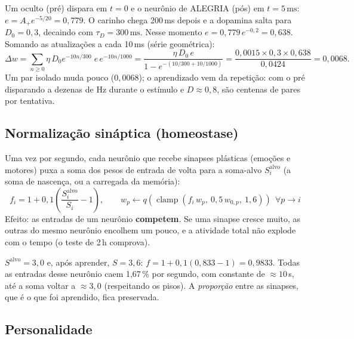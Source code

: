 \documentclass[11pt,a4paper]{article}
\newcommand{\ms}{\,\mathrm{ms}}
\begin{document}
\begin{exemplo}
Um oculto (pré) dispara em $t=0$ e o neurônio de ALEGRIA (pós) em $t=5\ms$: $e = A_+ e^{-5/20} = 0{,}779$.
O carinho chega 200\,ms depois e a dopamina salta para $D_0 = 0{,}3$, decaindo com $\tau_D = 300\ms$.
Nesse momento $e = 0{,}779\,e^{-0{,}2} = 0{,}638$. Somando as atualizações a cada 10\,ms (série geométrica):
\[
\Delta w = \sum_{n\ge0} \eta\, D_0 e^{-10n/300}\; e\, e^{-10n/1000} = \frac{\eta\,D_0\,e}{1 - e^{-(10/300 + 10/1000)}}
= \frac{0{,}0015 \times 0{,}3 \times 0{,}638}{0{,}0424} = 0{,}0068 .
\]
Um par isolado muda pouco ($0{,}0068$); o aprendizado vem da repetição: com o pré disparando a dezenas de Hz durante o estímulo e
$D \approx 0{,}8$, são centenas de pares por tentativa.
\end{exemplo}

\subsection{Normalização sináptica (homeostase)}

Uma vez por segundo, cada neurônio que recebe sinapses plásticas (emoções e motores) puxa a soma dos pesos de entrada de volta para
a soma-alvo $S^\text{alvo}_i$ (a soma de nascença, ou a carregada da memória):
\begin{equation}
f_i = 1 + 0{,}1\left(\frac{S^\text{alvo}_i}{S_i} - 1\right), \qquad w_p \leftarrow q\!\left(\operatorname{clamp}\left(f_i\,w_p,\ 0{,}5\,w_{0,p},\ 1{,}6\right)\right)
\ \ \forall p \to i
\end{equation}
Efeito: as entradas de um neurônio \textbf{competem}. Se uma sinapse cresce muito, as outras do mesmo neurônio encolhem um pouco, e a
atividade total não explode com o tempo (o teste de 2\,h comprova).

\begin{exemplo}
$S^\text{alvo} = 3{,}0$ e, após aprender, $S = 3{,}6$: $f = 1 + 0{,}1(0{,}833 - 1) = 0{,}9833$. Todas as entradas desse neurônio
caem 1,67\,\% por segundo, com constante de $\approx 10$\,s, até a soma voltar a $\approx 3{,}0$ (respeitando os pisos). A
\emph{proporção} entre as sinapses, que é o que foi aprendido, fica preservada.
\end{exemplo}

\subsection{Personalidade}\label{sec:personalidade}
\end{document}
